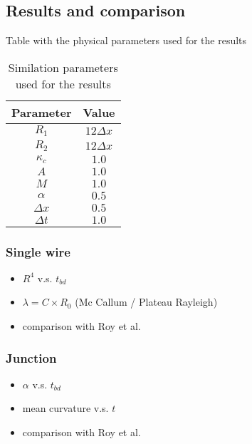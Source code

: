 \subsection{Results and comparison}
    Table with the physical parameters used for the results
    \begin{table}[H]
        \centering
        \begin{tabular}{|c|c|}
            \hline
            Parameter & Value \\
            \hline
            $R_1$ & $12 \Delta x$ \\
            $R_2$ & $12 \Delta x$ \\
            $\kappa_c$ & $1.0$ \\
            $A$ & $1.0$ \\
            $M$ & $1.0$ \\
            $\alpha$ & $0.5$ \\
            $\Delta x$ & $0.5$ \\
            $\Delta t$ & $1.0$ \\
            \hline
        \end{tabular}
        \caption{Similation parameters used for the results}
        \label{tab:2-parameters}
    \end{table}
    \subsubsection{Single wire}
    \begin{itemize}
        \item $R^4$ v.s. $t_{bd}$
        \item $\lambda = C \times R_0$ (Mc Callum / Plateau Rayleigh)
        \item comparison with Roy et al.
    \end{itemize}
    \subsubsection{Junction}
    \begin{itemize}
        \item $\alpha$ v.s. $t_{bd}$
        \item mean curvature v.s. $t$
        \item comparison with Roy et al.
    \end{itemize}
